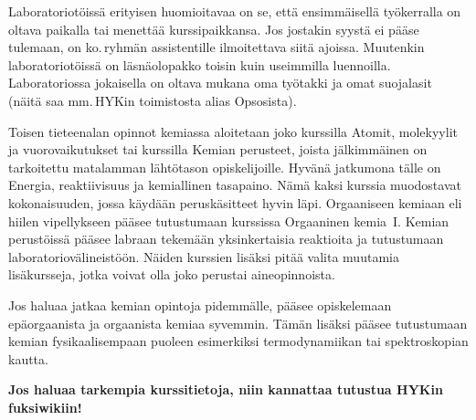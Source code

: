 \documentclass[../ala_hataile.tex]{subfiles}
\begin{document}
Laboratoriotöissä erityisen huomioitavaa
on se, että ensimmäisellä työkerralla on oltava
paikalla tai menettää kurssipaikkansa.
Jos jostakin syystä ei pääse tulemaan, on
ko.\,ryhmän assistentille ilmoitettava siitä
ajoissa. Muutenkin laboratoriotöissä on
läsnä\-olo\-pakko toisin kuin useimmilla luennoilla.
Laboratoriossa jokaisella on oltava
mukana oma työtakki ja omat suojalasit
(näitä saa mm.\,HYKin toimistosta alias Opsosista).
	
	Toisen tieteenalan opinnot kemiassa
	aloitetaan joko kurssilla Atomit, molekyylit
	ja vuorovaikutukset tai kurssilla
	Kemian perusteet, joista jälkimmäinen on tarkoitettu matalamman lähtötason opiskelijoille. Hyvänä jatkumona tälle
	on Energia, reaktiivisuus ja kemiallinen
	tasapaino. Nämä kaksi kurssia muodostavat
	kokonaisuuden, jossa käydään peruskäsitteet
	hyvin läpi. Orgaaniseen kemiaan
	eli hiilen vipellykseen pääsee tutustumaan
	kurssissa Orgaaninen kemia~I. 
	Kemian perustöissä pääsee labraan
	tekemään yksinkertaisia reaktioita ja
	tutustumaan laboratoriovälineistöön. Näiden
	kurssien lisäksi pitää valita muutamia
	lisäkursseja, jotka voivat olla joko perustai
	aineopinnoista.
	
	Jos haluaa jatkaa kemian opintoja pidemmälle,
	pääsee opiskelemaan epäorgaanista
	ja orgaanista kemiaa syvemmin.
	Tämän lisäksi pääsee tutustumaan kemian
	fysikaalisempaan puoleen esimerkiksi termodynamiikan
	tai spektroskopian kautta.
	
	\noindent\textbf{Jos haluaa tarkempia kurssitietoja,
		niin kannattaa tutustua HYKin fuksi\-wikiin!}
\end{document}
